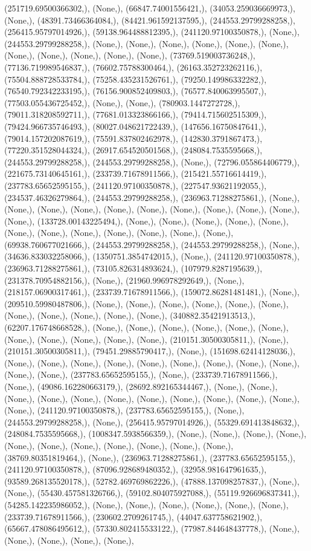\documentclass{article}
\begin{document}
(251719.69500366302,), (None,), (66847.74001556421,), (34053.259036669973,), (None,), (48391.73466364084,), (84421.961592137595,), (244553.29799288258,), (256415.95797014926,), (59138.964488812395,), (241120.97100350878,), (None,), (244553.29799288258,), (None,), (None,), (None,), (None,), (None,), (None,), (None,), (None,), (None,), (None,), (None,), (73769.519003736248,), (77136.719989546837,), (76602.75788300464,), (26163.352723262116,), (75504.888728533784,), (75258.435231526761,), (79250.149986332282,), (76540.792342233195,), (76156.900852409803,), (76577.840063995507,), (77503.055436725452,), (None,), (None,), (780903.1447272728,), (79011.318208592711,), (77681.013323866166,), (79414.715602515309,), (79424.966735746493,), (80027.048621722439,), (147656.16750847641,), (79014.157202087619,), (75591.837802462978,), (142830.3791867473,), (77220.351528044324,), (26917.654520501568,), (248084.7535595668,), (244553.29799288258,), (244553.29799288258,), (None,), (72796.055864406779,), (221675.73140645161,), (233739.71678911566,), (215421.55716614419,), (237783.65652595155,), (241120.97100350878,), (227547.93621192055,), (234537.46326279864,), (244553.29799288258,), (236963.71288275861,), (None,), (None,), (None,), (None,), (None,), (None,), (None,), (None,), (None,), (None,), (None,), (133728.00143225494,), (None,), (None,), (None,), (None,), (None,), (None,), (None,), (None,), (None,), (None,), (None,), (None,), (69938.760677021666,), (244553.29799288258,), (244553.29799288258,), (None,), (34636.833032258066,), (1350751.3854742015,), (None,), (241120.97100350878,), (236963.71288275861,), (73105.826314893624,), (107979.8287195639,), (231378.70954882156,), (None,), (21960.996978292649,), (None,), (218157.06900317461,), (233739.71678911566,), (159072.86281481481,), (None,), (209510.59980487806,), (None,), (None,), (None,), (None,), (None,), (None,), (None,), (None,), (None,), (None,), (None,), (340882.35421913513,), (62207.176748668528,), (None,), (None,), (None,), (None,), (None,), (None,), (None,), (None,), (None,), (None,), (None,), (210151.30500305811,), (None,), (210151.30500305811,), (79451.29885790417,), (None,), (151698.62414128036,), (None,), (None,), (None,), (None,), (None,), (None,), (None,), (None,), (None,), (None,), (None,), (237783.65652595155,), (None,), (233739.71678911566,), (None,), (49086.162280663179,), (28692.892165344467,), (None,), (None,), (None,), (None,), (None,), (None,), (None,), (None,), (None,), (None,), (None,), (None,), (241120.97100350878,), (237783.65652595155,), (None,), (244553.29799288258,), (None,), (256415.95797014926,), (55329.691413848632,), (248084.7535595668,), (1008347.5938566359,), (None,), (None,), (None,), (None,), (None,), (None,), (None,), (None,), (None,), (None,), (None,), (38769.80351819464,), (None,), (236963.71288275861,), (237783.65652595155,), (241120.97100350878,), (87096.928689480352,), (32958.981647961635,), (93589.268135520178,), (52782.469769862226,), (47888.137098257837,), (None,), (None,), (55430.457581326766,), (59102.804075927088,), (55119.926696837341,), (54285.142235986052,), (None,), (None,), (None,), (None,), (None,), (None,), (233739.71678911566,), (230602.2709261745,), (44047.637758621902,), (65667.478086495612,), (57330.802415533122,), (77987.844648437778,), (None,), (None,), (None,), (None,), (None,), 
\end{document}
